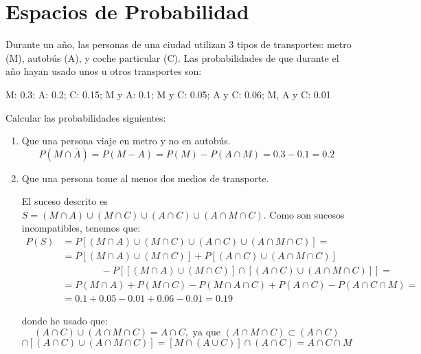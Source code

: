 \section{Espacios de Probabilidad}


\begin{ejercicio} \label{ej:3.Ejercicio1}
    Durante un año, las personas de una ciudad utilizan 3 tipos de transportes: metro (M), autobús (A), y coche particular (C). Las probabilidades de que durante el año hayan usado unos u otros transportes son:
    
    M: 0.3; \;A: 0.2; \;C: 0.15; \;M y A: 0.1; \;M y C: 0.05; \;A y C: 0.06; \;M, A y C: 0.01

    Calcular las probabilidades siguientes:
    \begin{enumerate}
        \item Que una persona viaje en metro y no en autobús.
        \begin{equation*}
            P(M\cap \bar{A}) = P(M-A) = P(M) - P(A\cap M) = 0.3 - 0.1 = 0.2
        \end{equation*}
        
        \item Que una persona tome al menos dos medios de transporte.

        El suceso descrito es $S = (M\cap A) \cup (M\cap C) \cup (A\cap C) \cup (A\cap M \cap C)$. Como son sucesos incompatibles, tenemos que:
        \begin{equation*}\begin{split}
            P(S) &= P[(M\cap A) \cup (M\cap C) \cup (A\cap C) \cup (A\cap M \cap C)] =\\
            &= P[(M\cap A) \cup (M\cap C)] + P[(A\cap C) \cup (A\cap M \cap C)] 
            \\& \qquad \qquad - P[[(M\cap A) \cup (M\cap C)] \cap [(A\cap C) \cup (A\cap M \cap C)]] = \\
            &= P(M\cap A) + P(M\cap C) - P(M\cap A \cap C) + P(A\cap C) - P(A\cap C \cap M)  = \\
            &= 0.1 +0.05 - 0.01 +0.06 -0.01 = 0.19
        \end{split}\end{equation*}

        donde he usado que:
        \begin{equation*}
            (A\cap C) \cup (A\cap M \cap C) = A\cap C,\text{ ya que } (A\cap M \cap C) \subset (A\cap C)
        \end{equation*}
        \begin{equation*}
            [(M\cap A) \cup (M\cap C)] \cap [(A\cap C) \cup (A\cap M \cap C)] = [M\cap (A\cup C)] \cap (A\cap C) = A\cap C \cap M
        \end{equation*}
        

\end{enumerate}
\end{ejercicio}
